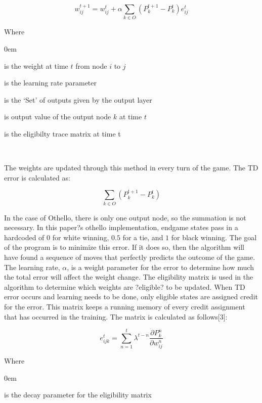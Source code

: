 \documentclass{sig-alternate-05-2015}
\begin{document}
\begin{equation}
w_{ij}^{t+1} = w_{ij}^t + \alpha  \sum\limits_{k\in O} (P_k^{t+1} - P_k^{t}) e_{ij}^t 
\end{equation}

Where
\begin{description}
\itemsep0em 
\item [w_{ij}^{t+1}] is the weight at time $t$ from node $i$ to $j$
\item[\alpha] is the learning rate parameter
\item[O] is the `Set' of outputs given by the output layer
\item[P_k^{t}] is output value of the output node $k$ at time $t$
\item[e_{ij}^t] is the eligibilty trace matrix at time t
\end{description} 
\
	
The weights are updated through this method in every turn of the game. The TD error is calculated as: 

\begin{equation}
 \sum\limits_{k \in O} (P_k^{t+1} - P_k^t)
\end{equation}

In the case of Othello, there is only one output node, so the summation is not necessary. In this paper?s othello implementation, endgame states pass in a hardcoded of $0$ for white winning, $0.5$ for a tie, and $1$ for black winning. The goal of the program is to minimize this error. If it does so, then the algorithm will have found a sequence of moves that perfectly predicts the outcome of the game. The learning rate, $\alpha$, is a weight parameter for the error to determine how much the total error will affect the weight change. The eligibility matrix is used in the algorithm to determine which weights are ?eligible? to be updated. When TD error occurs and learning needs to be done, only eligible states are assigned credit for the error. This matrix keeps a running memory of every credit assignment that has occurred in the training. The matrix is calculated as follows[3]:

\begin{equation}
e_{ijk}^t = \sum_{n=1}^{t} \lambda^{t-n} \frac{\partial P_k^n}{\partial w_{ij}^n}
\end{equation}

Where
\begin{description}
\itemsep0em 
\item [\lambda] is the decay parameter for the eligibility matrix
\end{description} 
\
\end{document}
